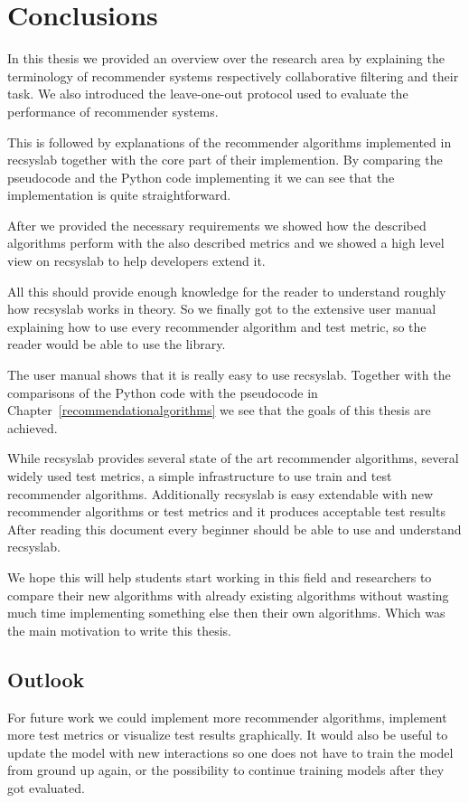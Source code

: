 
\chapter{Conclusions}
In this thesis we provided an overview over the research area by
explaining the terminology of recommender systems respectively
collaborative filtering and their task. We also introduced the leave-one-out
protocol used to evaluate the performance of recommender systems.

This is followed by explanations of the recommender algorithms implemented in recsyslab
together with the core part of their implemention. By comparing the pseudocode
and the Python code implementing it we can see that the implementation is quite
straightforward.

After we provided the necessary requirements we showed how the described algorithms
perform with the also described metrics and we showed a high level view on 
recsyslab to help developers extend it.

All this should provide enough knowledge for
the reader to understand roughly how recsyslab works in theory.
So we finally got to the extensive user manual 
explaining how to use every recommender algorithm and test metric, so the reader
would be able to use the library.

The user manual shows that it is really easy to use recsyslab.
Together with the comparisons of the Python code with the pseudocode
in Chapter~\ref{recommendationalgorithms} we see that the goals of
this thesis are achieved.

While recsyslab provides several state of the art recommender algorithms,
several widely used test metrics, a simple infrastructure to use train and test
recommender algorithms. Additionally recsyslab is easy extendable with new 
recommender algorithms or test metrics and it produces acceptable test results
After reading this document every beginner should be able to use and understand recsyslab.

We hope this will help students start working in this field and researchers to compare their new algorithms
with already existing algorithms without wasting much time implementing something else
then their own algorithms. Which was the main motivation to write this thesis.


\section{Outlook}
For future work we could implement more recommender algorithms,
implement more test metrics or visualize test results graphically.
It would also be useful to update the model with new interactions so 
one does not have to train the model from ground up again, or the 
possibility to continue training models after they got evaluated.

